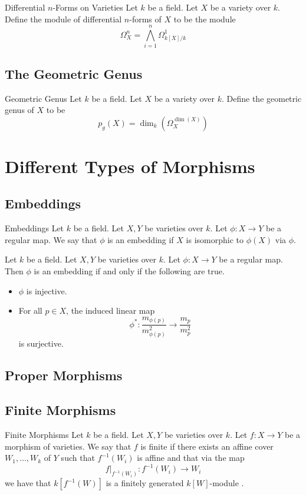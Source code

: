 \documentclass[a4paper]{article}
\begin{document}
\begin{defn}{Differential $n$-Forms on Varieties}{} Let $k$ be a field. Let $X$ be a variety over $k$. Define the module of differential $n$-forms of $X$ to be the module $$\Omega_X^n=\bigwedge_{i=1}^n\Omega_{k[X]/k}^1$$
\end{defn}

\subsection{The Geometric Genus}
\begin{defn}{Geometric Genus}{} Let $k$ be a field. Let $X$ be a variety over $k$. Define the geometric genus of $X$ to be $$p_g(X)=\dim_k\left(\Omega_X^{\dim(X)}\right)$$
\end{defn}

\pagebreak
\section{Different Types of Morphisms}
\subsection{Embeddings}
\begin{defn}{Embeddings}{} Let $k$ be a field. Let $X,Y$ be varieties over $k$. Let $\phi:X\to Y$ be a regular map. We say that $\phi$ is an embedding if $X$ is isomorphic to $\phi(X)$ via $\phi$. 
\end{defn}

\begin{prp}{}{} Let $k$ be a field. Let $X,Y$ be varieties over $k$. Let $\phi:X\to Y$ be a regular map. Then $\phi$ is an embedding if and only if the following are true. 
\begin{itemize}
\item $\phi$ is injective. 
\item For all $p\in X$, the induced linear map $$\phi^\ast:\frac{m_{\phi(p)}}{m_{\phi(p)}^2}\to\frac{m_p}{m_p^2}$$ is surjective. 
\end{itemize}
\end{prp}

\subsection{Proper Morphisms}

\subsection{Finite Morphisms}
\begin{defn}{Finite Morphisms}{} Let $k$ be a field. Let $X,Y$ be varieties over $k$. Let $f:X\to Y$ be a morphism of varieties. We say that $f$ is finite if there exists an affine cover $W_1,\dots,W_k$ of $Y$ such that $f^{-1}(W_i)$ is affine and that via the map $$f|_{f^{-1}(W_i)}:f^{-1}(W_i)\to W_i$$ we have that $k[f^{-1}(W)]$ is a finitely generated $k[W]$-module . 
\end{defn}
\end{document}
